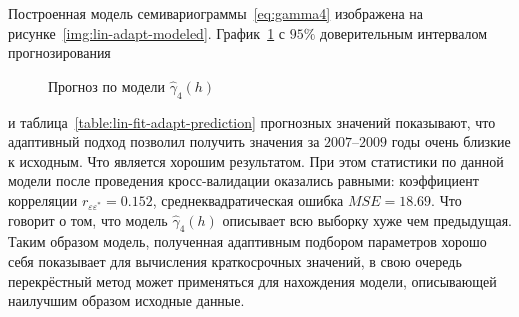 Построенная модель семивариограммы~\eqref{eq:gamma4} изображена на рисунке~\ref{img:lin-adapt-modeled}. График~\ref{img:lin-adapt-pred} с $95 \%$ доверительным интервалом прогнозирования
\begin{figure}[ht]
\caption{Прогноз по модели $ \widehat{\gamma}_4(h) $}
\label{img:lin-adapt-pred}
\end{figure}
и таблица~\ref{table:lin-fit-adapt-prediction} прогнозных значений показывают, что адаптивный подход позволил получить значения за $ 2007 $--$ 2009 $ годы очень близкие к исходным. Что является хорошим результатом. При этом статистики по данной модели после проведения кросс-валидации оказались равными: коэффициент корреляции $ r_{\varepsilon\varepsilon^{*}} = 0.152 $, среднеквадратическая ошибка $ MSE = 18.69 $. Что говорит о том, что модель $ \widehat{\gamma}_4(h) $ описывает всю выборку хуже чем предыдущая. Таким образом модель, полученная адаптивным подбором параметров хорошо себя показывает для вычисления краткосрочных значений, в свою очередь перекрёстный метод может применяться для нахождения модели, описывающей наилучшим образом исходные данные.


